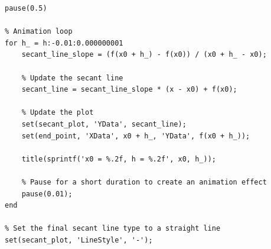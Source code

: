 \documentclass[13pt,a4paper]{report}
\begin{document}
\begin{verbatim}
pause(0.5)

% Animation loop
for h_ = h:-0.01:0.000000001
    secant_line_slope = (f(x0 + h_) - f(x0)) / (x0 + h_ - x0);

    % Update the secant line
    secant_line = secant_line_slope * (x - x0) + f(x0);
    
    % Update the plot
    set(secant_plot, 'YData', secant_line);
    set(end_point, 'XData', x0 + h_, 'YData', f(x0 + h_));
    
    title(sprintf('x0 = %.2f, h = %.2f', x0, h_));

    % Pause for a short duration to create an animation effect
    pause(0.01);
end

% Set the final secant line type to a straight line
set(secant_plot, 'LineStyle', '-');
\end{verbatim}
\end{document}
